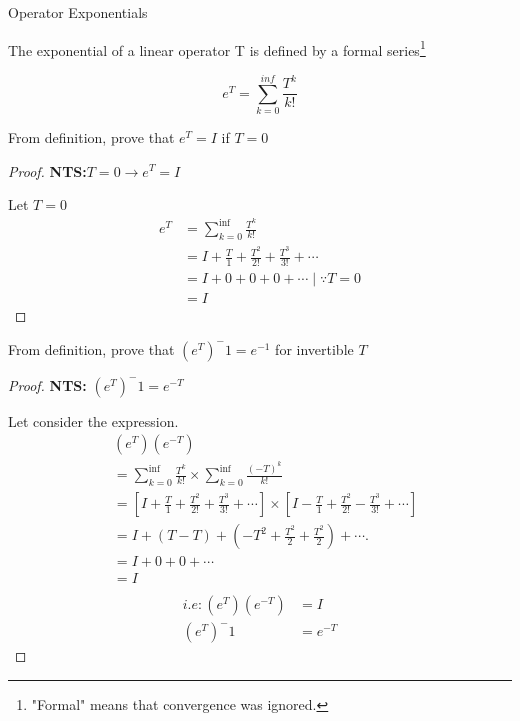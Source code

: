 \begin{definition}{Operator Exponentials}


The exponential of a linear operator T is defined by a formal series\footnote{"Formal" means that convergence was ignored.}

    \begin{equation}
        e^T=\sum^{inf}_{k=0} \frac{T^k}{k!}
    \end{equation}


\end{definition}
\begin{example}
  From definition, prove that $e^T=I$ if $T=0$
  
  \begin{proof}
  
  
    \textbf{NTS:}$ T=0 \xrightarrow{} e^T=I$
    
    
    Let $T=0$
\begin{align*}
 e^T &= \sum^{\inf}_{k=0} \frac{T^k}{k! }\\
      &= I + \frac{T}{1} + \frac{T^2}{2!} + \frac{T^3}{3!} + \cdots\\
      &= I + 0 + 0 + 0 + \cdots  \mid  \because T=0\\
      &= I
\end{align*}    
  
  \end{proof}
\end{example}



\begin{example}
  From definition, prove that $(e^T)^-1 = e^{-1}$ for invertible $T$
  
  
  \begin{proof}
    \textbf{NTS: }$(e^T)^-1 = e^{-T}$
    
    
    Let consider the expression.
\begin{align*}
                         & (e^T)(e^{-T}) \\
                         &= \sum^{\inf}_{k=0} \frac{T^k}{k! } \times \sum^{\inf}_{k=0} \frac{(-T)^k}{k! } \\
                         &= [I + \frac{T}{1} + \frac{T^2}{2!} + \frac{T^3}{3!} + \cdots]\times [I - \frac{T}{1} + \frac{T^2}{2!} - \frac{T^3}{3!} + \cdots] \\
                         &= I + (T -T) + (-T^2 + \frac{T^2}{2} + \frac{T^2}{2}) + \cdots. \\
                         &= I + 0 + 0 + \cdots \\
                         &= I \\
\end{align*}   
\begin{align*}
    i.e: (e^T)(e^{-T}) &= I \\
    (e^T)^-1 &= e^{-T}
\end{align*}   
    
  \end{proof}
  
\end{example}

